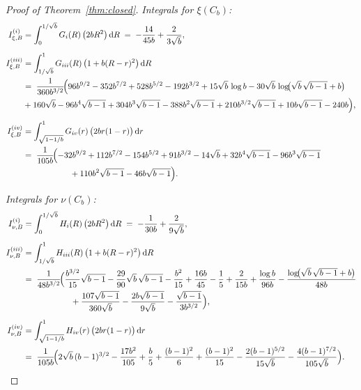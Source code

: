 \documentclass{article}
\newcommand{\1}{\mathds{1}}
\newcommand{\de}{\mathrm{\,d}}
\begin{document}
\begin{proof}[Proof of Theorem~\ref{thm:closed}]
\smallskip
\noindent\emph{Integrals for \(\xi(C_b)\):}
\begin{align*}
I^{(i)}_{\xi,B}
&=\int_{0}^{1/\sqrt b} G_i(R)\,\bigl(2bR^2\bigr)\de R
   \;=\; -\frac{14}{45b}+\frac{2}{3\sqrt b},\\[2mm]
I^{(iii)}_{\xi,B}
&=\int_{1/\sqrt b}^{1} G_{iii}(R)\,\bigl(1+b(R-r)^2\bigr)\de R\\
&=\;\frac{1}{360b^{3/2}}\!\Bigl(
96b^{9/2}-352b^{7/2}+528b^{5/2}-192b^{3/2}
+15\sqrt b\,\log b -30\sqrt b\,\log\!\bigl(\sqrt b\,\sqrt{b-1}+b\bigr)\\
&
+160\sqrt b -96b^4\sqrt{b-1}
+304b^3\sqrt{b-1} -388b^2\sqrt{b-1}
+210b^{3/2}\sqrt{b-1}
+10b\sqrt{b-1}
-240b
\Bigr),\allowdisplaybreaks\\[2mm]
I^{(iv)}_{\xi,B}
&=\int_{\sqrt{1-1/b}}^{1} G_{iv}(r)\,\bigl(2br(1-r)\bigr)\de r\\
&=\;\frac{1}{105b}\!\Bigl(
-32b^{9/2}+112b^{7/2}-154b^{5/2}+91b^{3/2}
-14\sqrt b+32b^4\sqrt{b-1}-96b^3\sqrt{b-1}\\
&\hspace{2cm}
+110b^2\sqrt{b-1}-46b\sqrt{b-1}
\Bigr).
\end{align*}

\smallskip
\noindent\emph{Integrals for \(\nu(C_b)\):}
\begin{align*}
I^{(i)}_{\nu,B}
&=\int_{0}^{1/\sqrt b} H_i(R)\,\bigl(2bR^2\bigr)\de R
   \;=\; -\frac{1}{30b}+\frac{2}{9\sqrt b},\\[2mm]
I^{(iii)}_{\nu,B}
&=\int_{1/\sqrt b}^{1} H_{iii}(R)\,\bigl(1+b(R-r)^2\bigr)\de R\\
&=\;\frac{1}{48b^{3/2}}\!\Bigl(
\frac{b^{3/2}}{15}\sqrt{b-1}
-\frac{29}{90}\sqrt b\,\sqrt{b-1}
-\frac{b^2}{15}
+\frac{16b}{45}
-\frac15
+\frac{2}{15b}
+\frac{\log b}{96b}
-\frac{\log\!\bigl(\sqrt b\,\sqrt{b-1}+b\bigr)}{48b}\\
&\hspace{2cm}
+\frac{107\sqrt{b-1}}{360\sqrt b}
-\frac{2b\sqrt{b-1}}{9\sqrt b}
-\frac{\sqrt{b-1}}{3b^{3/2}}
\Bigr),\allowdisplaybreaks\\[2mm]
I^{(iv)}_{\nu,B}
&=\int_{\sqrt{1-1/b}}^{1} H_{iv}(r)\,\bigl(2br(1-r)\bigr)\de r\\
&=\;\frac{1}{105b}\!\Bigl(
2\sqrt b\,(b-1)^{3/2}
-\frac{17b^2}{105}
+\frac{b}{5}
+\frac{(b-1)^2}{6}
+\frac{(b-1)^2}{15}
-\frac{2(b-1)^{5/2}}{15\sqrt b}
-\frac{4(b-1)^{7/2}}{105\sqrt b}
\Bigr).
\end{align*}


\end{proof}
\end{document}
